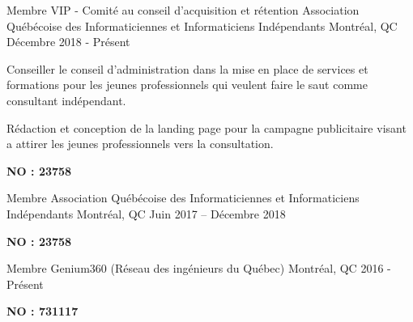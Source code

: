 
\begin{cventries}

  \cventry
    {Membre VIP - Comité au conseil d'acquisition et rétention}
    {Association Québécoise des Informaticiennes et Informaticiens Indépendants}
    {Montréal, QC}
    {Décembre 2018 - Présent}
    {
      \begin{cvitems}
        \item {Conseiller le conseil d'administration dans la mise en place de services et formations pour les jeunes professionnels qui veulent faire le saut comme consultant indépendant.}
		\item {Rédaction et conception de la landing page pour la campagne publicitaire visant a attirer les jeunes professionnels vers la consultation.}
		\item {\textbf{NO : 23758}}
      \end{cvitems}
    }

  \cventry
    {Membre}
    {Association Québécoise des Informaticiennes et Informaticiens Indépendants}
    {Montréal, QC}
    {Juin 2017 – Décembre 2018}
    {
      \begin{cvitems}
		\item {\textbf{NO : 23758}}
      \end{cvitems}
    }

  \cventry
    {Membre}
    {Genium360 (Réseau des ingénieurs du Québec)}
    {Montréal, QC}
    {2016 - Présent}
    {
      \begin{cvitems}
		\item {\textbf{NO : 731117}}
      \end{cvitems}
    }

\end{cventries}